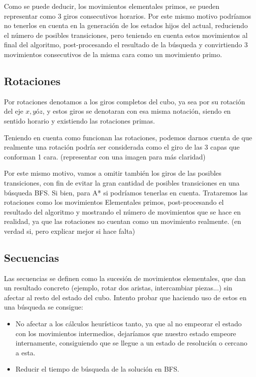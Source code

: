 \documentclass[11pt]{article}
\begin{document}
	Como se puede deducir, los movimientos elementales primos, se pueden representar como 3 giros consecutivos horarios. Por este mismo motivo podríamos no tenerlos en cuenta en la generación de los estados hijos del actual, reduciendo el número de posibles transiciones, pero teniendo en cuenta estos movimientos al final del algoritmo, post-procesando el resultado de la búsqueda y convirtiendo 3 movimientos consecutivos de la misma cara como un movimiento primo.
\subsection{Rotaciones}
	Por rotaciones denotamos a los giros completos del cubo, ya sea por su rotación del eje $x, y $ó$ z$, y estos giros se denotaran con esa misma notación, siendo en sentido horario y existiendo las rotaciones primas. 

Teniendo en cuenta como funcionan las rotaciones, podemos darnos cuenta de que realmente una rotación podría ser considerada como el giro de las 3 capas que conforman 1 cara. (representar con una imagen para más claridad)

Por este mismo motivo, vamos a  omitir también los giros de las posibles transiciones, con fin de evitar la gran cantidad de posibles transiciones en una búsqueda BFS. Si bien, para A* si podríamos tenerlas en cuenta.
Trataremos las rotaciones como los movimientos Elementales primos, post-procesando el resultado del algoritmo y mostrando el número de movimientos que se hace en realidad, ya que las rotaciones no cuentan como un movimiento realmente. (en verdad si, pero explicar mejor si hace falta)

\subsection{Secuencias}
	Las secuencias se definen como la sucesión de movimientos elementales, que dan un resultado concreto (ejemplo, rotar dos aristas, intercambiar piezas...) sin afectar al resto del estado del cubo. Intento probar que haciendo uso de estos en una búsqueda se consigue:
\begin{itemize}
	\item No afectar a los cálculos heurísticos tanto, ya que al no empeorar el estado con los movimientos intermedios, dejaríamos que nuestro estado empeore internamente, consiguiendo que se llegue a un estado de resolución o cercano a esta.
	\item Reducir el tiempo de búsqueda de la solución en BFS.
\end{itemize}
\end{document}
